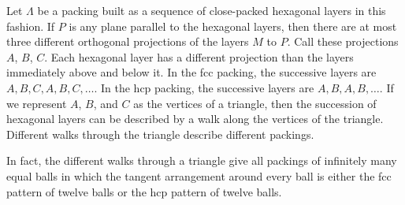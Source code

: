 Let $\Lambda$ be a packing built as a sequence of close-packed
hexagonal layers in this fashion.  If $P$ is any plane parallel to
the hexagonal layers, then there are at most three different
orthogonal projections of the layers $M$ to $P$.  Call these
projections $A$, $B$, $C$.  Each hexagonal layer has a different
projection than the layers immediately above and below it.  In the
fcc packing, the successive layers are $A,B,C,A,B,C,\ldots$.  In
the hcp packing, the successive layers are $A,B,A,B,\ldots$.  If
we represent $A$, $B$, and $C$ as the vertices of a triangle, then
the succession of hexagonal layers can be described by a walk
along the vertices of the triangle. Different walks through the
triangle describe different packings.


In fact, the different walks through a triangle give all packings of
infinitely many equal balls in which the tangent arrangement around
every ball is either the fcc pattern of twelve balls or the hcp
pattern of twelve balls.

\bigskip


